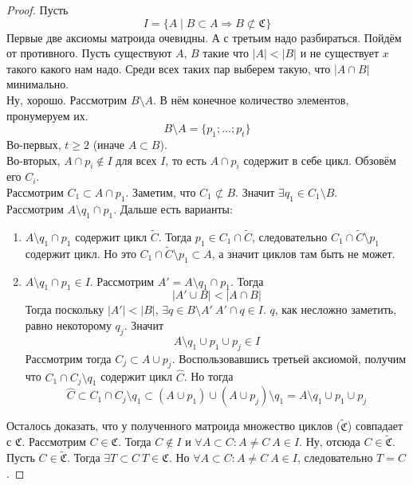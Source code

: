 \documentclass{article}
\begin{document}
    \begin{proof}
        Пусть
        $$
        I=\{A\mid B\subset A\Rightarrow B\not\subset\mathfrak C\}
        $$
        Первые две аксиомы матроида очевидны. А с третьим надо разбираться. Пойдём от противного. Пусть существуют $A$, $B$ такие что $|A|<|B|$ и не существует $x$ такого какого нам надо. Среди всех таких пар выберем такую, что $|A\cap B|$ минимально.\\
        Ну, хорошо. Рассмотрим $B\setminus A$. В нём конечное количество элементов, пронумеруем их.
        $$
        B\setminus A=\{p_1;\ldots;p_t\}
        $$
        Во-первых, $t\geqslant 2$ (иначе $A\subset B$).\\
        Во-вторых, $A\cap p_i\notin I$ для всех $I$, то есть $A\cap p_i$ содержит в себе цикл. Обзовём его $C_i$.\\
        Рассмотрим $C_1\subset A\cap p_1$. Заметим, что $C_1\not\subset B$. Значит $\exists q_1\in C_1\setminus B$.\\
        Рассмотрим $A\setminus q_1\cap p_1$. Дальше есть варианты:
        \begin{enumerate}
            \item $A\setminus q_1\cap p_1$ содержит цикл $\tilde C$. Тогда $p_1\in C_1\cap\tilde C$, следовательно $C_1\cap\tilde C\setminus p_1$ содержит цикл. Но это $C_1\cap\tilde C\setminus p_1\subset A$, а значит циклов там быть не может.
            \item $A\setminus q_1\cap p_1\in I$. Рассмотрим $A'=A\setminus q_1\cap p_1$. Тогда
            $$
            |A'\cup B|<|A\cap B|
            $$
            Тогда поскольку $|A'|<|B|$, $\exists q\in B\setminus A'~A'\cap q\in I$. $q$, как несложно заметить, равно некоторому $q_j$. Значит
            $$
            A\setminus q_1\cup p_1\cup p_j\in I
            $$
            Рассмотрим тогда $C_j\subset A\cup p_j$. Воспользовавшись третьей аксиомой, получим что $C_1\cap C_j\setminus q_1$ содержит цикл $\hat C$. Но тогда
            $$
            \hat C\subset C_1\cap C_j\setminus q_1\subset (A\cup p_1)\cup(A\cup p_j)\setminus q_1=A\setminus q_1\cup p_1\cup p_j
            $$
        \end{enumerate}
        Осталось доказать, что у полученного матроида множество циклов ($\tilde{\mathfrak C}$) совпадает с $\mathfrak C$. Рассмотрим $C\in\mathfrak C$. Тогда $C\notin I$ и $\forall A\subset C:A\neq C~A\in I$. Ну, отсюда $C\in\tilde{\mathfrak C}$.\\
        Пусть $C\in\tilde{\mathfrak C}$. Тогда $\exists T\subset C~T\in\mathfrak C$. Но $\forall A\subset C:A\neq C~A\in I$, следовательно $T=C$.
    \end{proof}
\end{document}
